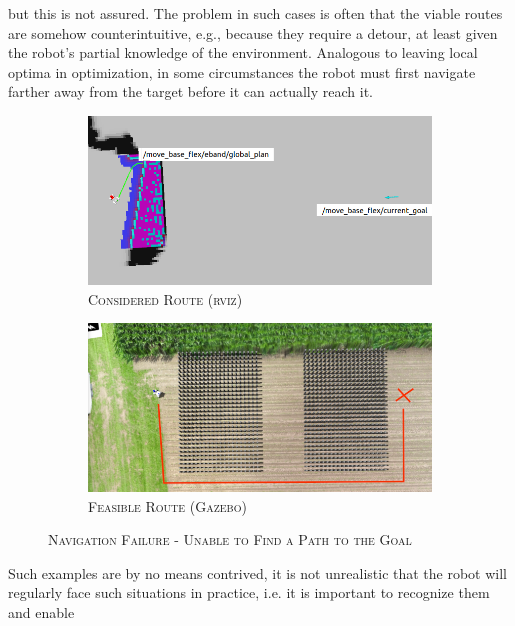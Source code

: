 \documentclass[english, master, utf8]{base/thesis_KBS}
\begin{document}
but this is not assured. The problem in such cases is often that the viable routes are somehow counterintuitive, e.g., because they require a detour, at least given the robot's partial
knowledge of the environment. Analogous to leaving local optima in optimization, in some circumstances the robot must first navigate farther away from the target before it can actually
reach it.
\begin{figure}[H]
    \centering
    \begin{subfigure}[b]{0.49\textwidth}
        \centering
        \includegraphics[width=\textwidth]{pics/nav_fail_wrong_route_0.png}
        \caption{\textsc{Considered Route (rviz)}}
        \label{fig:nav_fail_rviz}
    \end{subfigure}
    \hfill
    \begin{subfigure}[b]{0.49\textwidth}
        \centering
        \includegraphics[width=\textwidth]{pics/nav_fail_wrong_route_1.png}
        \caption{\textsc{Feasible Route (Gazebo)}}
        \label{fig:nav_fail_gazebo}
    \end{subfigure}
\caption{\textsc{Navigation Failure - Unable to Find a Path to the Goal}}
\label{fig:nav_fail}
\end{figure}
Such examples are by no means contrived, it is not unrealistic that the robot will regularly face such situations in practice, i.e. it is important to recognize them and enable
\end{document}
